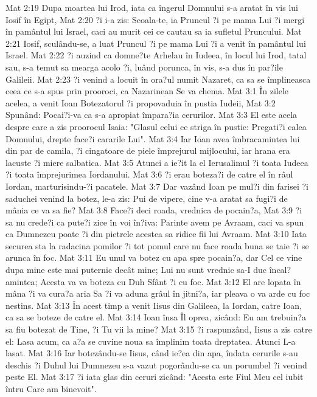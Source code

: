 Mat 2:19  Dupa moartea lui Irod, iata ca îngerul Domnului s-a aratat în vis lui Iosif în Egipt,
Mat 2:20  ?i i-a zis: Scoala-te, ia Pruncul ?i pe mama Lui ?i mergi în pamântul lui Israel, caci au murit cei ce cautau sa ia sufletul Pruncului.
Mat 2:21  Iosif, sculându-se, a luat Pruncul ?i pe mama Lui ?i a venit în pamântul lui Israel.
Mat 2:22  ?i auzind ca domne?te Arhelau în Iudeea, în locul lui Irod, tatal sau, s-a temut sa mearga acolo ?i, luând porunca, în vis, s-a dus în par?ile Galileii.
Mat 2:23  ?i venind a locuit în ora?ul numit Nazaret, ca sa se împlineasca ceea ce s-a spus prin prooroci, ca Nazarinean Se va chema.
Mat 3:1  În zilele acelea, a venit Ioan Botezatorul ?i propovaduia în pustia Iudeii,
Mat 3:2  Spunând: Pocai?i-va ca s-a apropiat împara?ia cerurilor.
Mat 3:3  El este acela despre care a zis proorocul Isaia: "Glasul celui ce striga în pustie: Pregati?i calea Domnului, drepte face?i cararile Lui".
Mat 3:4  Iar Ioan avea îmbracamintea lui din par de camila, ?i cingatoare de piele împrejurul mijlocului, iar hrana era lacuste ?i miere salbatica.
Mat 3:5  Atunci a ie?it la el Ierusalimul ?i toata Iudeea ?i toata împrejurimea Iordanului.
Mat 3:6  ?i erau boteza?i de catre el în râul Iordan, marturisindu-?i pacatele.
Mat 3:7  Dar vazând Ioan pe mul?i din farisei ?i saduchei venind la botez, le-a zis: Pui de vipere, cine v-a aratat sa fugi?i de mânia ce va sa fie?
Mat 3:8  Face?i deci roada, vrednica de pocain?a,
Mat 3:9  ?i sa nu crede?i ca pute?i zice în voi în?iva: Parinte avem pe Avraam, caci va spun ca Dumnezeu poate ?i din pietrele acestea sa ridice fii lui Avraam.
Mat 3:10  Iata securea sta la radacina pomilor ?i tot pomul care nu face roada buna se taie ?i se arunca în foc.
Mat 3:11  Eu unul va botez cu apa spre pocain?a, dar Cel ce vine dupa mine este mai puternic decât mine; Lui nu sunt vrednic sa-I duc încal?amintea; Acesta va va boteza cu Duh Sfânt ?i cu foc.
Mat 3:12  El are lopata în mâna ?i va cura?a aria Sa ?i va aduna grâul în jitni?a, iar pleava o va arde cu foc nestins.
Mat 3:13  În acest timp a venit Iisus din Galileea, la Iordan, catre Ioan, ca sa se boteze de catre el.
Mat 3:14  Ioan însa Îl oprea, zicând: Eu am trebuin?a sa fiu botezat de Tine, ?i Tu vii la mine?
Mat 3:15  ?i raspunzând, Iisus a zis catre el: Lasa acum, ca a?a se cuvine noua sa împlinim toata dreptatea. Atunci L-a lasat.
Mat 3:16  Iar botezându-se Iisus, când ie?ea din apa, îndata cerurile s-au deschis ?i Duhul lui Dumnezeu s-a vazut pogorându-se ca un porumbel ?i venind peste El.
Mat 3:17  ?i iata glas din ceruri zicând: "Acesta este Fiul Meu cel iubit întru Care am binevoit".
